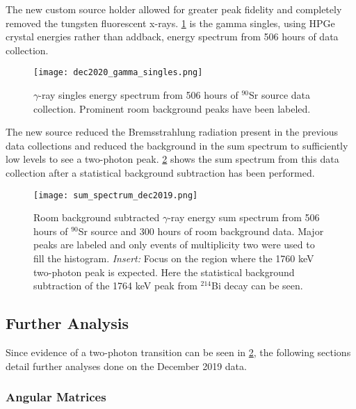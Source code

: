 \documentclass[cnatzke_thesis_proposal.tex]{subfiles}
\begin{document}
The new custom source holder allowed for greater peak fidelity and completely removed the tungsten fluorescent x-rays.
\ref{fig:dec2020_gamma_singles} is the gamma singles, using HPGe crystal energies rather than addback, energy spectrum from 506 hours of data collection.

\begin{figure}[htbp]
  \centering
  \texttt{[image: dec2020\_gamma\_singles.png]}
  \caption{$\gamma$-ray singles energy spectrum from 506 hours of $^{90}$Sr source data collection. Prominent room background peaks have been labeled.}
  \label{fig:dec2020_gamma_singles}
\end{figure}

The new source reduced the Bremsstrahlung radiation present in the previous data collections and reduced the background in the sum spectrum to sufficiently low levels to see a two-photon peak.
\ref{fig:sum_spectrum_dec2019} shows the sum spectrum from this data collection after a statistical background subtraction has been performed.

\begin{figure}[htbp]
  \centering
  \texttt{[image: sum\_spectrum\_dec2019.png]}
  \caption{Room background subtracted $\gamma$-ray energy sum spectrum from 506 hours of $^{90}$Sr source and 300 hours of room background data. Major peaks are labeled and only events of multiplicity two were used to fill the histogram. \textit{Insert:} Focus on the region where the 1760 keV two-photon peak is expected. Here the statistical background subtraction of the 1764 keV peak from $^{214}$Bi decay can be seen.}
  \label{fig:sum_spectrum_dec2019}
\end{figure}

\subsection{Further Analysis}
\label{sec:further_analysis}
Since evidence of a two-photon transition can be seen in \ref{fig:sum_spectrum_dec2019}, the following sections detail further analyses done on the December 2019 data.

\subsubsection{Angular Matrices}
\label{sec:angular_matrices}
\end{document}
